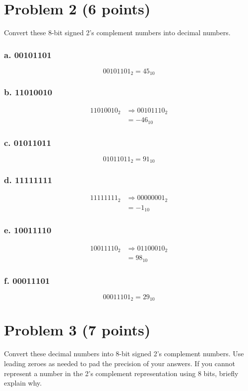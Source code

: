\documentclass{article}
\begin{document}
\section*{Problem 2 (6 points)}
Convert these 8-bit signed 2’s complement numbers into decimal numbers. 
\subsubsection*{a. 00101101}
\begin{equation}
    00101101_2 = 45_{10}
\end{equation}
\subsubsection*{b. 11010010}
\begin{align}
    11010010_2 &\Rightarrow 00101110_2\\
    &= -46_{10}
\end{align}
\subsubsection*{c. 01011011}
\begin{equation}
    01011011_2 = 91_{10}
\end{equation}
\subsubsection*{d. 11111111}
\begin{align}
    11111111_2 &\Rightarrow 00000001_2\\
    &= -1_{10}
\end{align}
\subsubsection*{e. 10011110}
\begin{align}
    10011110_2 &\Rightarrow 01100010_2\\
    &= 98_{10}
\end{align}
\subsubsection*{f. 00011101}
\begin{equation}
    00011101_2 = 29_{10}
\end{equation}
\newpage
\section*{Problem 3 (7 points)}
Convert these decimal numbers into 8-bit signed 2’s complement numbers. Use leading zeroes as needed to pad the precision of your answers. If you cannot represent a number in the 2’s complement representation using 8 bits, briefly explain why.
\end{document}
